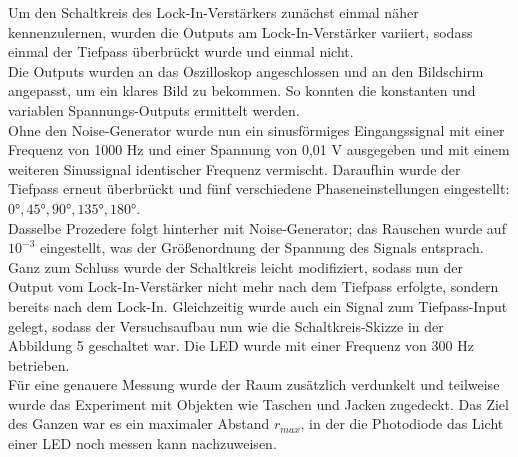 \documentclass[captions=tableheading]{scrartcl}
\begin{document}
Um den Schaltkreis des Lock-In-Verstärkers zunächst einmal näher kennenzulernen, wurden die Outputs am Lock-In-Verstärker variiert, sodass einmal der Tiefpass überbrückt wurde und einmal nicht.
\\
Die Outputs wurden an das Oszilloskop angeschlossen und an den Bildschirm angepasst, um ein klares Bild zu bekommen. So konnten die konstanten und variablen Spannungs-Outputs ermittelt werden.  
\\ 
Ohne den Noise-Generator wurde nun ein sinusförmiges Eingangssignal mit einer Frequenz von 1000 Hz und einer Spannung von 0,01 V ausgegeben und mit einem weiteren Sinussignal identischer Frequenz vermischt. Daraufhin wurde der Tiefpass erneut überbrückt und fünf verschiedene Phaseneinstellungen eingestellt: \(0°, 45°, 90°, 135°, 180°\).
\\ 
Dasselbe Prozedere folgt hinterher mit Noise-Generator; das Rauschen wurde auf $10^{-3}$ eingestellt, was der Größenordnung der Spannung des Signals entsprach.
\\ 
Ganz zum Schluss wurde der Schaltkreis leicht modifiziert, sodass nun der Output vom Lock-In-Verstärker nicht mehr nach dem Tiefpass erfolgte, sondern bereits nach dem Lock-In. 
Gleichzeitig wurde auch ein Signal zum Tiefpass-Input gelegt, sodass der Versuchsaufbau nun wie die Schaltkreis-Skizze in der Abbildung 5 geschaltet war. Die LED wurde mit einer Frequenz von 300 Hz betrieben. 
\\
Für eine genauere Messung wurde der Raum zusätzlich verdunkelt und teilweise wurde das Experiment mit Objekten wie Taschen und Jacken zugedeckt. Das Ziel des Ganzen war es ein maximaler Abstand \(r_{max}\), in der die Photodiode das Licht einer LED noch messen kann nachzuweisen.
\newpage
\end{document}

